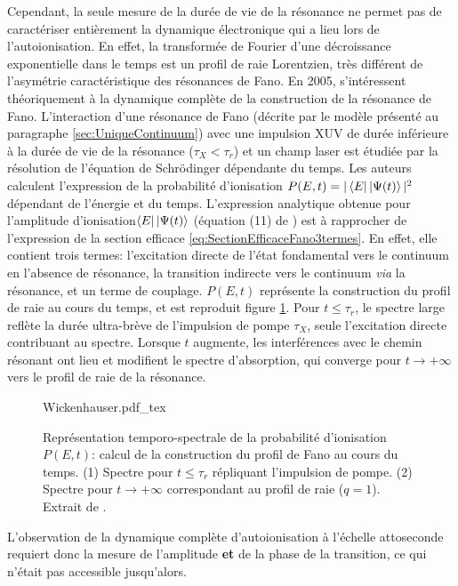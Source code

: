 Cependant, la seule mesure de la durée de vie de la résonance ne permet pas de caractériser entièrement la dynamique électronique qui a lieu lors de l'autoionisation. En effet, la transformée de Fourier d'une décroissance exponentielle dans le temps est un profil de raie Lorentzien, très différent de l'asymétrie caractéristique des résonances de Fano. En 2005,  s'intéressent théoriquement à la dynamique complète de la construction de la résonance de Fano. L'interaction d'une résonance de Fano (décrite par le modèle présenté au paragraphe \ref{sec:UniqueContinuum}) avec une impulsion XUV de durée inférieure à la durée de vie de la résonance ($\tau_X < \tau_r$) et un champ laser est étudiée par la résolution de l'équation de Schrödinger dépendante du temps. Les auteurs calculent l'expression de la probabilité d'ionisation $P(E, t) = |\bra{E}\ket{\Psi (t)}|^2$ dépendant de l'énergie et du temps. L'expression analytique obtenue pour l'amplitude d'ionisation$\bra{E}\ket{\Psi (t)}$ (équation (11) de ) est à rapprocher de l'expression de la section efficace \ref{eq:SectionEfficaceFano3termes}. En effet, elle contient trois termes: l'excitation directe de l'état fondamental vers le continuum en l'absence de résonance, la transition indirecte vers le continuum \textit{via} la résonance, et un terme de couplage. $P(E, t)$ représente la construction du profil de raie au cours du temps, et est reproduit figure \ref{fig:Wickenhauser}. Pour $t \leq \tau_r$, le spectre large reflète la durée ultra-brève de l'impulsion de pompe $\tau_X$, seule l'excitation directe contribuant au spectre. Lorsque $t$ augmente, les interférences avec le chemin résonant ont lieu et modifient le spectre d'absorption, qui converge pour $t \rightarrow + \infty$ vers le profil de raie de la résonance. 

\begin{figure}[h]
\centering
\def\svgwidth{0.6\textwidth}
{Wickenhauser.pdf_tex}
\caption{Représentation temporo-spectrale de la probabilité d'ionisation $P(E, t)$: calcul de la construction du profil de Fano au cours du temps. (1) Spectre pour $t \leq \tau_r$ répliquant l'impulsion de pompe. (2) Spectre pour $t \rightarrow + \infty$ correspondant au profil de raie ($q = 1$). Extrait de .}
\label{fig:Wickenhauser}
\end{figure}

L'observation de la dynamique complète d'autoionisation à l'échelle attoseconde requiert donc la mesure de l'amplitude \textbf{et} de la phase de la transition, ce qui n'était pas accessible jusqu'alors.

